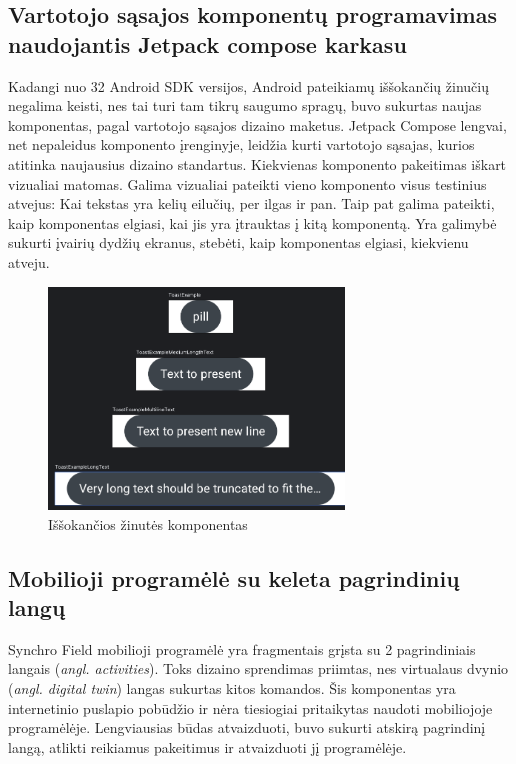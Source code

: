 \subsection{Vartotojo sąsajos komponentų programavimas naudojantis Jetpack compose karkasu}
Kadangi nuo 32 Android SDK versijos, Android pateikiamų iššokančių žinučių negalima keisti, nes tai turi tam tikrų saugumo spragų, buvo sukurtas naujas komponentas, pagal vartotojo sąsajos 
dizaino maketus. Jetpack Compose lengvai, net nepaleidus komponento įrenginyje, leidžia kurti vartotojo sąsajas, kurios atitinka naujausius dizaino standartus. Kiekvienas komponento pakeitimas iškart vizualiai matomas.
 Galima vizualiai pateikti vieno komponento visus testinius atvejus: Kai tekstas yra kelių eilučių, per ilgas ir pan. Taip pat galima pateikti, kaip komponentas elgiasi, kai jis yra įtrauktas į kitą komponentą.
  Yra galimybė sukurti įvairių dydžių ekranus, stebėti, kaip komponentas elgiasi, kiekvienu atveju. 

\begin{figure}[htbp!]
    \centering
    \includegraphics[width=0.7\textwidth]{Images/pillAndroid.png}
    \caption{Iššokančios žinutės komponentas}
    \label{fig:pill}
\end{figure}
\newpage
\subsection{Mobilioji programėlė su keleta pagrindinių langų}
Synchro Field mobilioji programėlė yra fragmentais grįsta su 2 pagrindiniais langais (\emph{angl. activities}). Toks dizaino sprendimas priimtas, nes virtualaus dvynio (\emph{angl. digital twin}) langas sukurtas kitos komandos. Šis komponentas yra
internetinio puslapio pobūdžio ir nėra tiesiogiai pritaikytas naudoti mobiliojoje programėlėje. Lengviausias būdas atvaizduoti, buvo sukurti atskirą pagrindinį langą, atlikti reikiamus pakeitimus ir atvaizduoti jį programėlėje.
 
